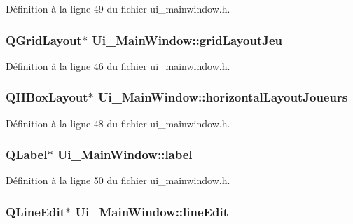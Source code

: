 Définition à la ligne 49 du fichier ui\-\_\-mainwindow.\-h.

\hypertarget{class_ui___main_window_a3b659bbe89dcd06d32a7039a432ff110}{
\subsubsection[{grid\-Layout\-Jeu}]{\setlength{\rightskip}{0pt plus 5cm}Q\-Grid\-Layout$\ast$ Ui\-\_\-\-Main\-Window\-::grid\-Layout\-Jeu}}\label{class_ui___main_window_a3b659bbe89dcd06d32a7039a432ff110}


Définition à la ligne 46 du fichier ui\-\_\-mainwindow.\-h.

\hypertarget{class_ui___main_window_a9a43633211d56018140b0d718e9fcc2e}{
\subsubsection[{horizontal\-Layout\-Joueurs}]{\setlength{\rightskip}{0pt plus 5cm}Q\-H\-Box\-Layout$\ast$ Ui\-\_\-\-Main\-Window\-::horizontal\-Layout\-Joueurs}}\label{class_ui___main_window_a9a43633211d56018140b0d718e9fcc2e}


Définition à la ligne 48 du fichier ui\-\_\-mainwindow.\-h.

\hypertarget{class_ui___main_window_ad9c89133780f28e6efa2ec17ceb9cff5}{
\subsubsection[{label}]{\setlength{\rightskip}{0pt plus 5cm}Q\-Label$\ast$ Ui\-\_\-\-Main\-Window\-::label}}\label{class_ui___main_window_ad9c89133780f28e6efa2ec17ceb9cff5}


Définition à la ligne 50 du fichier ui\-\_\-mainwindow.\-h.

\hypertarget{class_ui___main_window_a7a5b9a4633d64f502ce81da3202d828c}{
\subsubsection[{line\-Edit}]{\setlength{\rightskip}{0pt plus 5cm}Q\-Line\-Edit$\ast$ Ui\-\_\-\-Main\-Window\-::line\-Edit}}\label{class_ui___main_window_a7a5b9a4633d64f502ce81da3202d828c}


